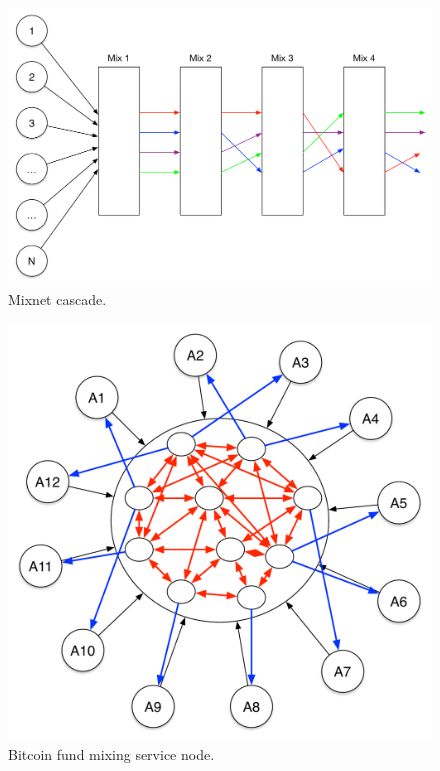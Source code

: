 \begin{figure}
\begin{center}
\includegraphics[scale=0.35]{images/mix_design.pdf}
\caption{Mixnet cascade.}
\label{fig:mix-design}
\end{center}
\end{figure}

\begin{figure}
\begin{center}
\includegraphics[scale=0.35]{images/mix_bitcoin.pdf}
\caption{Bitcoin fund mixing service node.}
\label{fig:mix-bitcoin}
\end{center}
\end{figure}

